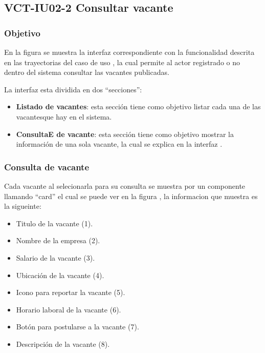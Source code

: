 \clearpage
\subsection{VCT-IU02-2 Consultar vacante}

\subsubsection{Objetivo}
En la figura  se muestra la interfaz correspondiente con la funcionalidad descrita en las
trayectorias del caso de uso  , la cual permite al actor registrado o no dentro del sistema consultar 
las vacantes publicadas.

La interfaz esta dividida en dos ``secciones'':
\begin{itemize}
   \item \textbf{Listado de vacantes}: esta sección tiene como objetivo listar cada una de las vacantesque hay en el sistema.
   \item \textbf{ConsultaE de vacante}: esta sección tiene como objetivo mostrar la información de una sola vacante, la cual se explica en 
   la interfaz .
\end{itemize}


\subsubsection{Consulta de vacante}
Cada vacante al selecionarla para su consulta se muestra por un componente llamando ``card'' el cual se puede ver en la figura , la informacion que 
muestra es la sigueinte: 
\begin{itemize}
   \item Titulo de la vacante (1).
   \item Nombre de la empresa (2).
   \item Salario de la vacante (3).
   \item Ubicación de la vacante (4).
   \item Icono para reportar la vacante (5).
   \item Horario laboral de la vacante (6).
   \item Botón para postularse a la vacante (7).
   \item Descripción de la vacante (8).
\end{itemize}




\clearpage
